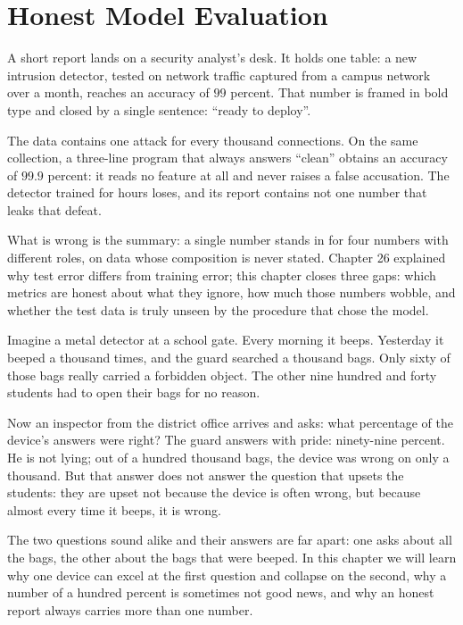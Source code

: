 \chapter{Honest Model Evaluation}

A short report lands on a security analyst's desk. It holds one table: a new intrusion detector,
tested on network traffic captured from a campus network over a month, reaches an accuracy of
$99$ percent. That number is framed in bold type and closed by a single sentence:
``ready to deploy''.

The data contains one attack for every thousand connections. On the same collection, a three-line
program that always answers ``clean'' obtains an accuracy of $99.9$ percent: it reads no feature at
all and never raises a false accusation. The detector trained for hours loses, and its report
contains not one number that leaks that defeat.

What is wrong is the summary: a single number stands in for four numbers with different roles, on
data whose composition is never stated. Chapter 26 explained why test error differs from training
error; this chapter closes three gaps: which metrics are honest about what they ignore, how much
those numbers wobble, and whether the test data is truly unseen by the procedure that chose the
model.

\begin{untukanak}
Imagine a metal detector at a school gate. Every morning it beeps. Yesterday it beeped a thousand
times, and the guard searched a thousand bags. Only sixty of those bags really carried a forbidden
object. The other nine hundred and forty students had to open their bags for no reason.

Now an inspector from the district office arrives and asks: what percentage of the device's answers
were right? The guard answers with pride: ninety-nine percent. He is not lying; out of a hundred
thousand bags, the device was wrong on only a thousand. But that answer does not answer the
question that upsets the students: they are upset not because the device is often wrong, but
because almost every time it beeps, it is wrong.

The two questions sound alike and their answers are far apart: one asks about all the bags, the
other about the bags that were beeped. In this chapter we will learn why one device can excel at
the first question and collapse on the second, why a number of a hundred percent is sometimes not
good news, and why an honest report always carries more than one number.
\end{untukanak}

